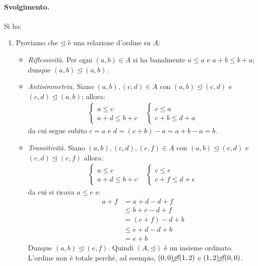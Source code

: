 \paragraph{Svolgimento.} Si ha:
\begin{enumerate}
	\item Proviamo che $\unlhd$ è una relazione d'ordine su $A$:
	\begin{itemize}
		\item \textit{Riflessività.} Per ogni $(a,b) \in A$ si ha banalmente $a \leq a$ e $a+b \leq b+a$; dunque $(a,b)\unlhd(a,b)$.
		\item \textit{Antisimmetria.} Siano $(a,b),(c,d) \in A$ con $(a,b) \unlhd (c,d)$ e $(c,d) \unlhd (a,b)$; allora:
		\begin{displaymath}
			\begin{array}{ll}
				\begin{cases}
					a \leq c \\
					a+d \leq b+c
				\end{cases}
				&
				\begin{cases}
					c \leq a \\
					c+b \leq d+a
				\end{cases}
			\end{array}
		\end{displaymath}
		da cui segue subito $c=a$ e $d=(c+b)-a=a+b-a=b$.
		\item \textit{Transitività.} Siano $(a,b),(c,d),(e,f) \in A$ con $(a,b) \unlhd (c,d)$ e $(c,d) \unlhd (e,f)$ allora:
		\begin{displaymath}
			\begin{array}{ll}
				\begin{cases}
					a \leq c \\
					a+d \leq b+c
				\end{cases}
				&
				\begin{cases}
					c \leq e \\
					c+f \leq d+e
				\end{cases}
			\end{array}
		\end{displaymath}
		da cui si ricava $a \leq e$ e:
		\begin{align*}
			a+f &= a+d-d+f \\
			&\leq b+c-d+f \\
			&= (c+f)-d+b \\
			&\leq e+d-d+b \\
			&= e+b
		\end{align*}
		Dunque $(a,b) \unlhd (e,f)$. Quindi $(A,\unlhd)$ è un insieme ordinato. L'ordine non è totale perché, ad esempio, $(0,0) \cancel{\unlhd} (1,2)$ e $(1,2) \cancel{\unlhd} (0,0)$.

\end{itemize}
\end{enumerate}

